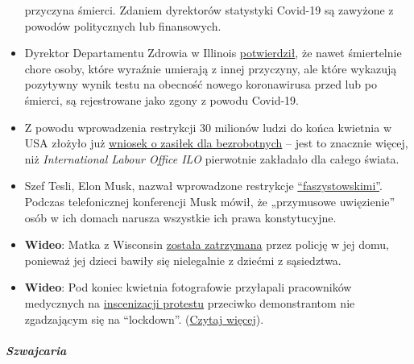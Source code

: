 \begin{itemize}
  przyczyna śmierci. Zdaniem dyrektorów statystyki Covid-19 są zawyżone
  z powodów politycznych lub finansowych.
\item
  Dyrektor Departamentu Zdrowia w Illinois
  \href{https://week.com/2020/04/20/idph-director-explains-how-covid-deaths-are-classified/}{potwierdził},
  że nawet śmiertelnie chore osoby, które wyraźnie umierają z innej
  przyczyny, ale które wykazują pozytywny wynik testu na obecność nowego
  koronawirusa przed lub po śmierci, są rejestrowane jako zgony z powodu
  Covid-19.
\item
  Z powodu wprowadzenia restrykcji 30 milionów ludzi do końca kwietnia w
  USA złożyło już
  \href{https://edition.cnn.com/2020/04/30/economy/unemployment-benefits-coronavirus/index.html}{wniosek
  o zasiłek dla bezrobotnych} -- jest to znacznie więcej, niż
  \emph{International Labour Office ILO} pierwotnie zakładało dla całego
  świata.
\item
  Szef Tesli, Elon Musk, nazwał wprowadzone restrykcje
  \href{https://www.theguardian.com/technology/2020/apr/29/tesla-quarterly-earnings-coronavirus-shares}{``faszystowskimi''}.
  Podczas telefonicznej konferencji Musk mówił, że „przymusowe
  uwięzienie'' osób w ich domach narusza wszystkie ich prawa
  konstytucyjne.
\item
  \textbf{Wideo}: Matka z Wisconsin
  \href{https://twitter.com/AlexBerenson/status/1256219418343981056}{została
  zatrzymana} przez policję w jej domu, ponieważ jej dzieci bawiły się
  nielegalnie z dziećmi z sąsiedztwa.
\item
  \textbf{Wideo}: Pod koniec kwietnia fotografowie przyłapali
  pracowników medycznych na
  \href{https://twitter.com/talialikeitis/status/1253126254942773248}{inscenizacji
  protestu} przeciwko demonstrantom nie zgadzającym się na ``lockdown''.
  (\href{https://www.buzzfeednews.com/article/tasneemnashrulla/photos-denver-nurses-block-anti-lockdown-protest}{Czytaj
  więcej}).
\end{itemize}

\hypertarget{szwajcaria}{%
\subparagraph{\texorpdfstring{\textbf{Szwajcaria}}{Szwajcaria}}\label{szwajcaria}}

